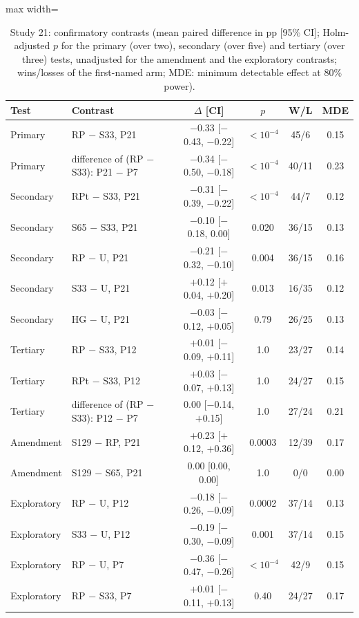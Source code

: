\begin{table}[t]
\caption{Study 21: confirmatory contrasts (mean paired difference in pp [95\% CI]; Holm-adjusted $p$ for the primary (over two), secondary (over five) and tertiary (over three) tests, unadjusted for the amendment and the exploratory contrasts; wins/losses of the first-named arm; MDE: minimum detectable effect at 80\% power).}\label{tab:s21f}
\centering
\small
\begin{adjustbox}{max width=\linewidth}
\begin{tabular}{llcccc}
\toprule
Test & Contrast & $\Delta$ [CI] & $p$ & W/L & MDE \\
\midrule
Primary & RP $-$ S33, P21 & $-$0.33 [$-$0.43, $-$0.22] & \ensuremath{<10^{-4}} & 45/6 & 0.15 \\
Primary & difference of (RP $-$ S33): P21 $-$ P7 & $-$0.34 [$-$0.50, $-$0.18] & \ensuremath{<10^{-4}} & 40/11 & 0.23 \\
Secondary & RPt $-$ S33, P21 & $-$0.31 [$-$0.39, $-$0.22] & \ensuremath{<10^{-4}} & 44/7 & 0.12 \\
Secondary & S65 $-$ S33, P21 & $-$0.10 [$-$0.18, 0.00] & 0.020 & 36/15 & 0.13 \\
Secondary & RP $-$ U, P21 & $-$0.21 [$-$0.32, $-$0.10] & 0.004 & 36/15 & 0.16 \\
Secondary & S33 $-$ U, P21 & $+$0.12 [$+$0.04, $+$0.20] & 0.013 & 16/35 & 0.12 \\
Secondary & HG $-$ U, P21 & $-$0.03 [$-$0.12, $+$0.05] & 0.79 & 26/25 & 0.13 \\
Tertiary & RP $-$ S33, P12 & $+$0.01 [$-$0.09, $+$0.11] & 1.0 & 23/27 & 0.14 \\
Tertiary & RPt $-$ S33, P12 & $+$0.03 [$-$0.07, $+$0.13] & 1.0 & 24/27 & 0.15 \\
Tertiary & difference of (RP $-$ S33): P12 $-$ P7 & 0.00 [$-$0.14, $+$0.15] & 1.0 & 27/24 & 0.21 \\
Amendment & S129 $-$ RP, P21 & $+$0.23 [$+$0.12, $+$0.36] & 0.0003 & 12/39 & 0.17 \\
Amendment & S129 $-$ S65, P21 & 0.00 [0.00, 0.00] & 1.0 & 0/0 & 0.00 \\
Exploratory & RP $-$ U, P12 & $-$0.18 [$-$0.26, $-$0.09] & 0.0002 & 37/14 & 0.13 \\
Exploratory & S33 $-$ U, P12 & $-$0.19 [$-$0.30, $-$0.09] & 0.001 & 37/14 & 0.15 \\
Exploratory & RP $-$ U, P7 & $-$0.36 [$-$0.47, $-$0.26] & \ensuremath{<10^{-4}} & 42/9 & 0.15 \\
Exploratory & RP $-$ S33, P7 & $+$0.01 [$-$0.11, $+$0.13] & 0.40 & 24/27 & 0.17 \\
\bottomrule
\end{tabular}
\end{adjustbox}
\end{table}
